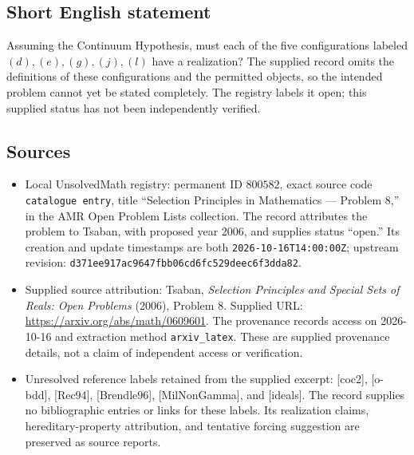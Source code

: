 \documentclass[11pt]{article}
\begin{document}
\subsection{Short English statement}
Assuming the Continuum Hypothesis, must each of the five configurations labeled \((d),(e),(g),(j),(l)\) have a realization? The supplied record omits the definitions of these configurations and the permitted objects, so the intended problem cannot yet be stated completely. The registry labels it open; this supplied status has not been independently verified.
\subsection{Sources}
\begin{itemize}
\item Local UnsolvedMath registry: permanent ID \(800582\), exact source code \texttt{catalogue entry}, title ``Selection Principles in Mathematics --- Problem 8,'' in the AMR Open Problem Lists collection. The record attributes the problem to Tsaban, with proposed year 2006, and supplies status ``open.'' Its creation and update timestamps are both \texttt{2026-10-16T14:00:00Z}; upstream revision: \texttt{d371ee917ac9647fbb06cd6fc529deec6f3dda82}.
\item Supplied source attribution: Tsaban, \emph{Selection Principles and Special Sets of Reals: Open Problems} (2006), Problem 8. Supplied URL: \url{https://arxiv.org/abs/math/0609601}. The provenance records access on 2026-10-16 and extraction method \texttt{arxiv\_latex}. These are supplied provenance details, not a claim of independent access or verification.
\item Unresolved reference labels retained from the supplied excerpt: [coc2], [o-bdd], [Rec94], [Brendle96], [MilNonGamma], and [ideals]. The record supplies no bibliographic entries or links for these labels. Its realization claims, hereditary-property attribution, and tentative forcing suggestion are preserved as source reports.
\end{itemize}
\end{document}
